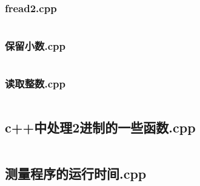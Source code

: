 \documentclass{article}
\begin{document}
\subsubsection{fread2.cpp}
\inputminted{c++}{/home/zzuzxy/t2/Template1.0/6 其它/IO/fread2.cpp}
\subsubsection{保留小数.cpp}
\inputminted{c++}{/home/zzuzxy/t2/Template1.0/6 其它/IO/保留小数.cpp}
\subsubsection{读取整数.cpp}
\inputminted{c++}{/home/zzuzxy/t2/Template1.0/6 其它/IO/读取整数.cpp}
\subsection{c++中处理2进制的一些函数.cpp}
\inputminted{c++}{/home/zzuzxy/t2/Template1.0/6 其它/c++中处理2进制的一些函数.cpp}
\subsection{测量程序的运行时间.cpp}
\inputminted{c++}{/home/zzuzxy/t2/Template1.0/6 其它/测量程序的运行时间.cpp}
\end{document}
